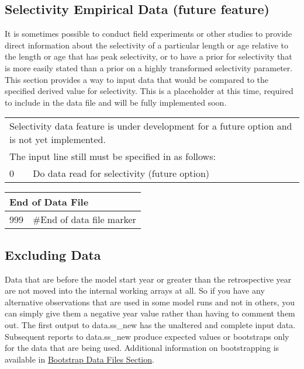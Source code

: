 \subsection{Selectivity Empirical Data (future feature)}
It is sometimes possible to conduct field experiments or other studies to provide direct information about the selectivity of a particular length or age relative to the length or age that has peak selectivity, or to have a prior for selectivity that is more easily stated than a prior on a highly transformed selectivity parameter.  This section provides a way to input data that would be compared to the specified derived value for selectivity.  This is a placeholder at this time, required to include in the data file and will be fully implemented soon.

\begin{center}
	\begin{tabular}{p{1cm} p{1.5cm} p{1.5cm} p{1.5cm} p{1.5cm} p{1.5cm} p{1.5cm} p{1.5cm} p{1.5cm}}
		\multicolumn{9}{l}{Selectivity data feature is under development for a future option and is not yet implemented.  }\\
		\multicolumn{9}{l}{The input line still must be specified in as follows:}\\
		\hline
		0 &  \multicolumn{8}{l}{Do data read for selectivity (future option)}\Tstrut\Bstrut\\
        \hline
	\end{tabular}
\end{center}

\begin{center}
	\begin{tabular}{p{2cm} p{14cm}}\\
		\multicolumn{2}{l}{End of Data File}\\
		\hline
		999 & \#End of data file marker\Tstrut\Bstrut\\
		\hline
	\end{tabular}
\end{center}


\subsection{Excluding Data}
Data that are before the model start year or greater than the retrospective year are not moved into the internal working arrays at all.  So if you have any alternative observations that are used in some model runs and not in others, you can simply give them a negative year value rather than having to comment them out. The first output to data.ss\_new has the unaltered and complete input data.  Subsequent reports to data.ss\_new produce expected values or bootstraps only for the data that are being used. Additional information on bootstrapping is available in \hyperlink{bootstrap}{Bootstrap Data Files Section}. 

